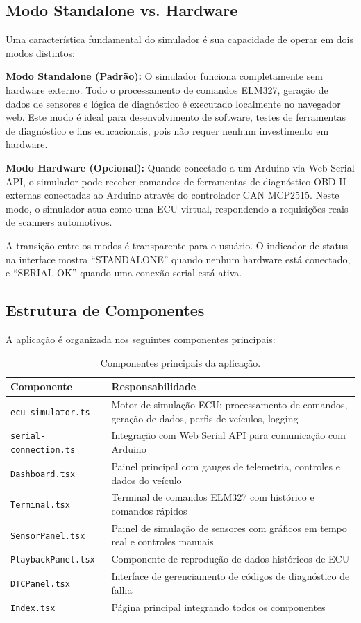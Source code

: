 \subsection{Modo Standalone vs. Hardware}

Uma característica fundamental do simulador é sua capacidade de operar em dois modos distintos:

\textbf{Modo Standalone (Padrão):} O simulador funciona completamente sem hardware externo. Todo o processamento de comandos ELM327, geração de dados de sensores e lógica de diagnóstico é executado localmente no navegador web. Este modo é ideal para desenvolvimento de software, testes de ferramentas de diagnóstico e fins educacionais, pois não requer nenhum investimento em hardware.

\textbf{Modo Hardware (Opcional):} Quando conectado a um Arduino via Web Serial API, o simulador pode receber comandos de ferramentas de diagnóstico OBD-II externas conectadas ao Arduino através do controlador CAN MCP2515. Neste modo, o simulador atua como uma ECU virtual, respondendo a requisições reais de scanners automotivos.

A transição entre os modos é transparente para o usuário. O indicador de status na interface mostra ``STANDALONE'' quando nenhum hardware está conectado, e ``SERIAL OK'' quando uma conexão serial está ativa.

\subsection{Estrutura de Componentes}

A aplicação é organizada nos seguintes componentes principais:

\begin{table}[H]
\centering
\caption{Componentes principais da aplicação.}
\label{tab:componentes}
\begin{tabular}{@{}lp{9cm}@{}}
\toprule
\textbf{Componente} & \textbf{Responsabilidade} \\
\midrule
\texttt{ecu-simulator.ts} & Motor de simulação ECU: processamento de comandos, geração de dados, perfis de veículos, logging \\
\texttt{serial-connection.ts} & Integração com Web Serial API para comunicação com Arduino \\
\texttt{Dashboard.tsx} & Painel principal com gauges de telemetria, controles e dados do veículo \\
\texttt{Terminal.tsx} & Terminal de comandos ELM327 com histórico e comandos rápidos \\
\texttt{SensorPanel.tsx} & Painel de simulação de sensores com gráficos em tempo real e controles manuais \\
\texttt{PlaybackPanel.tsx} & Componente de reprodução de dados históricos de ECU \\
\texttt{DTCPanel.tsx} & Interface de gerenciamento de códigos de diagnóstico de falha \\
\texttt{Index.tsx} & Página principal integrando todos os componentes \\
\bottomrule
\end{tabular}
\end{table}

